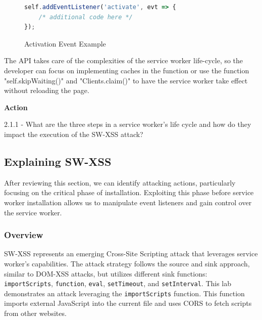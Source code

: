 \documentclass[letterpaper,12pt]{report}
\newcounter{taskset}
\newcounter{action}[taskset]
\begin{document}
\begin{figure}[H]
    \begin{lstlisting}[language=JavaScript]
self.addEventListener('activate', evt => {
    /* additional code here */
});
    \end{lstlisting}
    \caption{Activation Event Example}
    \label{fig:activate-example}
\end{figure}


 The API takes care of the complexities of the service worker life-cycle, so the developer can focus on implementing caches in the function or use the function "self.skipWaiting()" and "Clients.claim()" to have the service worker take effect without reloading the page. 

\bigskip

\bigskip
\begin{mdframed}[backgroundcolor=blue!10,style=code,nobreak=true,align=center,userdefinedwidth=14cm]
\textbf{Action}

2.1.1 - What are the three steps in a service worker's life cycle and how do they impact the execution of the SW-XSS attack?
\end{mdframed}

\subsection*{Explaining SW-XSS}

After reviewing this section, we can identify attacking actions, particularly focusing on the critical phase of installation. Exploiting this phase before service worker installation allows us to manipulate event listeners and gain control over the service worker.

\subsubsection*{Overview}

SW-XSS represents an emerging Cross-Site Scripting attack that leverages service worker's capabilities. The attack strategy follows the source and sink approach, similar to DOM-XSS attacks, but utilizes different sink functions: \texttt{importScripts}, \texttt{function}, \texttt{eval}, \texttt{setTimeout}, and \texttt{setInterval}. This lab demonstrates an attack leveraging the \texttt{importScripts} function. This function imports external JavaScript into the current file and uses CORS to fetch scripts from other websites.
\end{document}
